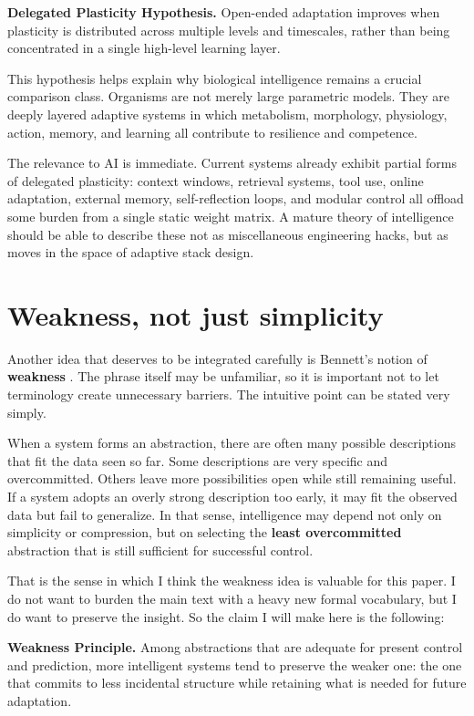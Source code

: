 \documentclass[11pt]{article}
\begin{document}
\textbf{Delegated Plasticity Hypothesis.} Open-ended adaptation improves when plasticity is distributed across multiple levels and timescales, rather than being concentrated in a single high-level learning layer.

This hypothesis helps explain why biological intelligence remains a crucial comparison class. Organisms are not merely large parametric models. They are deeply layered adaptive systems in which metabolism, morphology, physiology, action, memory, and learning all contribute to resilience and competence.

The relevance to AI is immediate. Current systems already exhibit partial forms of delegated plasticity: context windows, retrieval systems, tool use, online adaptation, external memory, self-reflection loops, and modular control all offload some burden from a single static weight matrix. A mature theory of intelligence should be able to describe these not as miscellaneous engineering hacks, but as moves in the space of adaptive stack design.

\section{Weakness, not just simplicity}


Another idea that deserves to be integrated carefully is Bennett's notion of \textbf{weakness} \citep{bennett2023}. The phrase itself may be unfamiliar, so it is important not to let terminology create unnecessary barriers. The intuitive point can be stated very simply.

When a system forms an abstraction, there are often many possible descriptions that fit the data seen so far. Some descriptions are very specific and overcommitted. Others leave more possibilities open while still remaining useful. If a system adopts an overly strong description too early, it may fit the observed data but fail to generalize. In that sense, intelligence may depend not only on simplicity or compression, but on selecting the \textbf{least overcommitted} abstraction that is still sufficient for successful control.

That is the sense in which I think the weakness idea is valuable for this paper. I do not want to burden the main text with a heavy new formal vocabulary, but I do want to preserve the insight. So the claim I will make here is the following:

\textbf{Weakness Principle.} Among abstractions that are adequate for present control and prediction, more intelligent systems tend to preserve the weaker one: the one that commits to less incidental structure while retaining what is needed for future adaptation.
\end{document}

